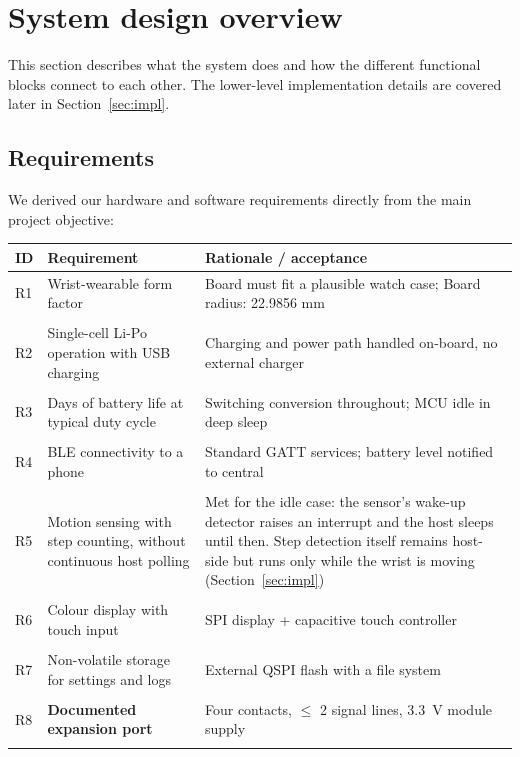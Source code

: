 \documentclass[12pt, a4paper]{article}
\begin{document}
\section{System design overview}
\label{sec:design}

This section describes what the system does and how the different functional blocks connect to each other. The lower-level implementation details are covered later in Section~\ref{sec:impl}.

\subsection{Requirements}

We derived our hardware and software requirements directly from the main project objective:

\begin{table}[H]
\centering
\small
\begin{tabular}{@{}p{1.4cm} p{5.6cm} p{7cm}@{}}
\toprule
\textbf{ID} & \textbf{Requirement} & \textbf{Rationale / acceptance} \\
\midrule
R1 & Wrist-wearable form factor & Board must fit a plausible watch case; Board radius: 22.9856 mm \\\\
R2 & Single-cell Li-Po operation with USB charging & Charging and power path handled on-board, no external charger \\\\
R3 & Days of battery life at typical duty cycle & Switching conversion throughout; MCU idle in deep sleep \\\\
R4 & BLE connectivity to a phone & Standard GATT services; battery level notified to central \\\\
R5 & Motion sensing with step counting, without continuous host polling & Met for the idle case: the sensor's wake-up detector raises an interrupt and the host sleeps until then. Step detection itself remains host-side but runs only while the wrist is moving (Section~\ref{sec:impl}) \\\\
R6 & Colour display with touch input & SPI display + capacitive touch controller \\\\
R7 & Non-volatile storage for settings and logs & External QSPI flash with a file system \\\\
R8 & \textbf{Documented expansion port} & Four contacts, $\le$ 2 signal lines, \SI{3.3}{\volt} module supply \\\\

\end{tabular}
\end{table}
\end{document}
